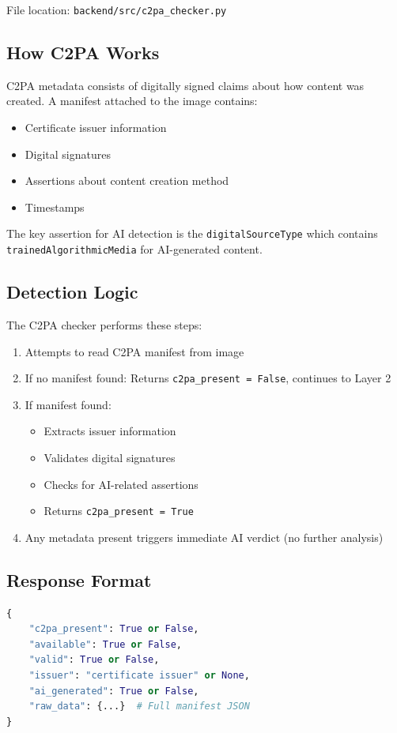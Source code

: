 \documentclass[12pt,a4paper]{book}
\begin{document}
File location: \texttt{backend/src/c2pa\_checker.py}

\subsection{How C2PA Works}
C2PA metadata consists of digitally signed claims about how content was created. A manifest attached to the image contains:
\begin{itemize}
    \item Certificate issuer information
    \item Digital signatures
    \item Assertions about content creation method
    \item Timestamps
\end{itemize}

The key assertion for AI detection is the \texttt{digitalSourceType} which contains \texttt{trainedAlgorithmicMedia} for AI-generated content.

\subsection{Detection Logic}
The C2PA checker performs these steps:

\begin{enumerate}
    \item Attempts to read C2PA manifest from image
    \item If no manifest found: Returns \texttt{c2pa\_present = False}, continues to Layer 2
    \item If manifest found:
    \begin{itemize}
        \item Extracts issuer information
        \item Validates digital signatures
        \item Checks for AI-related assertions
        \item Returns \texttt{c2pa\_present = True}
    \end{itemize}
    \item Any metadata present triggers immediate AI verdict (no further analysis)
\end{enumerate}

\subsection{Response Format}
\begin{lstlisting}[language=Python]
{
    "c2pa_present": True or False,
    "available": True or False,
    "valid": True or False,
    "issuer": "certificate issuer" or None,
    "ai_generated": True or False,
    "raw_data": {...}  # Full manifest JSON
}
\end{lstlisting}
\end{document}
